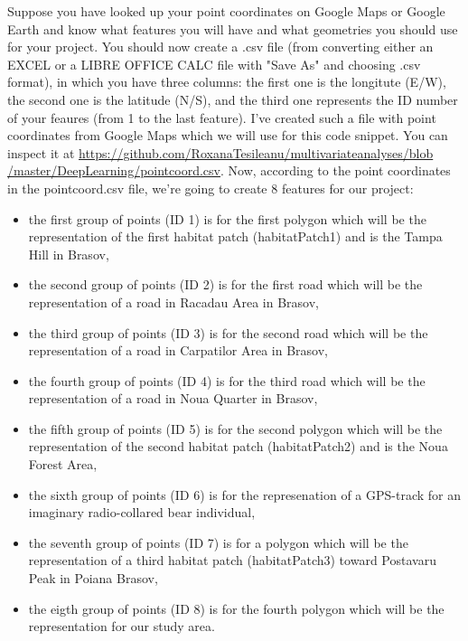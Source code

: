 \documentclass {article}
\begin{document}
Suppose you have looked up your point coordinates on Google Maps or Google Earth and know what features you will have and what geometries you should use for your project. 
You should now create a .csv file (from converting either an EXCEL or a LIBRE OFFICE CALC file with "Save As" and choosing .csv format), in which you have three columns: the first one is the longitute (E/W), the second one is the latitude (N/S), and the third one represents the ID number of your feaures (from 1 to the last feature).
 I've created such a file with point coordinates from Google Maps \cite{google_google_2017}which we will use for this code snippet. You can inspect it at \href{https://github.com/RoxanaTesileanu/multivariate_analyses/blob/master/DeepLearning/pointcoord.csv}{https://github.com/RoxanaTesileanu/multivariate\underline{\space}analyses/blob\\/master/DeepLearning/pointcoord.csv}. Now, according to the point coordinates in the pointcoord.csv file, we're going to create 8 features for our project:
\begin{itemize} 
\item the first group of points (ID 1) is for the first polygon which will be the representation of the first habitat patch (habitatPatch1) and is the Tampa Hill in Brasov,
\item the second group of points (ID 2) is for the first road which will be the representation of a road in Racadau Area in Brasov,
\item the third group of points (ID 3) is for the second road which will be the representation of a road in Carpatilor Area in Brasov,
\item the fourth group of points (ID 4) is for the third road which will be the representation of a road in Noua Quarter in Brasov,
\item the fifth group of points (ID 5) is for the second polygon which will be the representation of the second habitat patch (habitatPatch2) and is the Noua Forest Area,
\item the sixth group of points (ID 6) is for the represenation of a GPS-track for an imaginary radio-collared bear individual,
\item the seventh group of points (ID 7) is for a polygon which will be the representation of a third habitat patch (habitatPatch3) toward Postavaru Peak in Poiana Brasov,
\item the eigth group of points (ID 8) is for the fourth polygon which will be the representation for our study area. 
\end {itemize}
\end{document}
